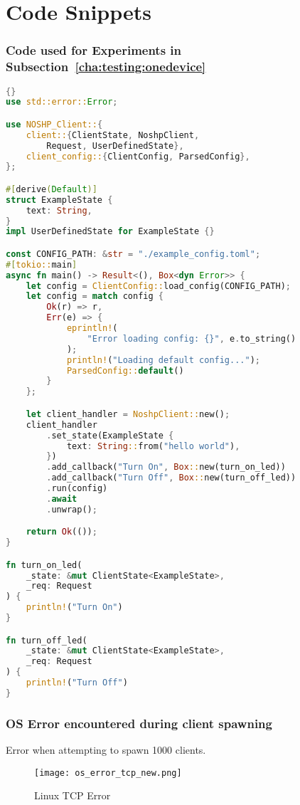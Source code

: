 \chapter{Code Snippets}
\label{chap:A2}

\subsection{Code used for Experiments in Subsection~\ref{cha:testing:onedevice}} \label{chap:A2:onedeviceclientlib}
\begin{lstlisting}[language=Rust, style=boxed, showstringspaces=false]{}
use std::error::Error;

use NOSHP_Client::{
    client::{ClientState, NoshpClient, 
        Request, UserDefinedState},
    client_config::{ClientConfig, ParsedConfig},
};

#[derive(Default)]
struct ExampleState {
    text: String,
}
impl UserDefinedState for ExampleState {}

const CONFIG_PATH: &str = "./example_config.toml";
#[tokio::main]
async fn main() -> Result<(), Box<dyn Error>> {
    let config = ClientConfig::load_config(CONFIG_PATH);
    let config = match config {
        Ok(r) => r,
        Err(e) => {
            eprintln!(
                "Error loading config: {}", e.to_string()
            );
            println!("Loading default config...");
            ParsedConfig::default()
        }
    };

    let client_handler = NoshpClient::new();
    client_handler
        .set_state(ExampleState {
            text: String::from("hello world"),
        })
        .add_callback("Turn On", Box::new(turn_on_led))
        .add_callback("Turn Off", Box::new(turn_off_led))
        .run(config)
        .await
        .unwrap();

    return Ok(());
}

fn turn_on_led(
    _state: &mut ClientState<ExampleState>,
    _req: Request
) {
    println!("Turn On")
}

fn turn_off_led(
    _state: &mut ClientState<ExampleState>,
    _req: Request
) {
    println!("Turn Off")
}
\end{lstlisting}

\pagebreak
\subsection{OS Error encountered during client spawning} 
Error when attempting to spawn 1000 clients.
\label{chap:A2:oserror}
\begin{figure}[h]
\caption{Linux TCP Error}
\texttt{[image: os\_error\_tcp\_new.png]}
\label{fig:tcperror}
\end{figure}


